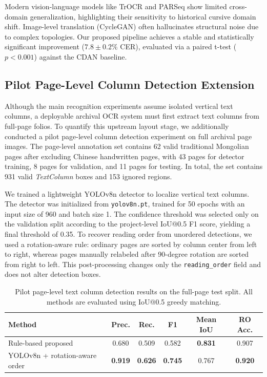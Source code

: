 \documentclass[11pt]{article}
\begin{document}
Modern vision-language models like TrOCR and PARSeq show limited cross-domain generalization, highlighting their sensitivity to historical cursive domain shift. Image-level translation (CycleGAN) often hallucinates structural noise due to complex topologies. Our proposed pipeline achieves a stable and statistically significant improvement ($7.8 \pm 0.2\%$ CER), evaluated via a paired t-test ($p < 0.001$) against the CDAN baseline.


\subsection{Pilot Page-Level Column Detection Extension}
Although the main recognition experiments assume isolated vertical text columns, a deployable archival OCR system must first extract text columns from full-page folios. To quantify this upstream layout stage, we additionally conducted a pilot page-level column detection experiment on full archival page images. The page-level annotation set contains 62 valid traditional Mongolian pages after excluding Chinese handwritten pages, with 43 pages for detector training, 8 pages for validation, and 11 pages for testing. In total, the set contains 931 valid \textit{TextColumn} boxes and 153 ignored regions.

We trained a lightweight YOLOv8n detector to localize vertical text columns. The detector was initialized from \texttt{yolov8n.pt}, trained for 50 epochs with an input size of 960 and batch size 1. The confidence threshold was selected only on the validation split according to the project-level IoU@0.5 F1 score, yielding a final threshold of 0.35. To recover reading order from unordered detections, we used a rotation-aware rule: ordinary pages are sorted by column center from left to right, whereas pages manually relabeled after 90-degree rotation are sorted from right to left. This post-processing changes only the \texttt{reading\_order} field and does not alter detection boxes.

\begin{table}[htbp]
\centering
\caption{Pilot page-level text column detection results on the full-page test split. All methods are evaluated using IoU@0.5 greedy matching.}
\label{tab:layout_detection_test}
\begin{tabular}{l c c c c c}
\toprule
\textbf{Method} & \textbf{Prec.} & \textbf{Rec.} & \textbf{F1} & \textbf{Mean IoU} & \textbf{RO Acc.} \\
\midrule
Rule-based proposed & 0.680 & 0.509 & 0.582 & \textbf{0.831} & 0.907 \\
YOLOv8n + rotation-aware order & \textbf{0.919} & \textbf{0.626} & \textbf{0.745} & 0.767 & \textbf{0.920} \\
\bottomrule
\end{tabular}
\end{table}
\end{document}
